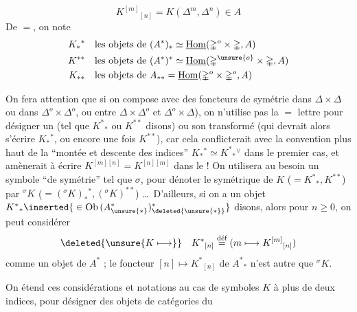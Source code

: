 \[
 K^{[m]}{}_{[n]}=K(\Delta^m,\Delta^n)\in A
\]
De $=$, on note
\[
 \begin{aligned}
 K_*{}^*&\quad\text{les objets de }(A^*)_*\simeq\underline{\mathrm{Hom}}(\mathbb{\Delta}^o\times\mathbb{\Delta},A)\\
 K^{**}&\quad\text{les objets de }(A^*)^*\simeq\underline{\mathrm{Hom}}(\mathbb{\Delta}^{\unsure{o}}\times\mathbb{\Delta},A)\\
 K_{**}&\quad\text{les objets de }A_{**}=\underline{\mathrm{Hom}}(\mathbb{\Delta}^o\times\mathbb{\Delta}^o,A)
 \end{aligned}
\]

On fera attention que si on compose avec  des foncteurs de symétrie   dans $\mathbb{\Delta}\times\mathbb{\Delta}$ ou dans $\mathbb{\Delta}^o\times\mathbb{\Delta}^o$, ou entre $\mathbb{\Delta}\times\mathbb{\Delta}^o$ et $\mathbb{\Delta}^o\times\mathbb{\Delta}$), on n'utilise pas la $=$ lettre pour désigner un   (tel que $K^*{}_*$ ou $K^{**}$ disons) ou son transformé (qui devrait alors s'écrire $K_*{}^*$, ou encore une fois $K^{**}$), car cela conflicterait avec la convention plus haut de la ``montée et descente des indices'' $K_*{}^*\simeq K^*{}_*{}^\vee$ dans le premier cas, et  amènerait à écrire $K^{[m][n]}=K^{[n][m]}$ dans le  ! On utilisera au besoin un symbole ``de symétrie'' tel que $\sigma$, pour dénoter le symétrique de $K$ ($=K^*{}_*,K^{**}$) par $ {}^{\sigma}K$ ($=({}^{\sigma}K)_*{}^*,({}^{\sigma}K)^{**}$) \ldots\ D'ailleurs,  si on a un objet $K^*{}_*\inserted{{}\in\mathrm{Ob}\,(A_{\unsure{*}}^{*})^{*}_{\deleted{\unsure{*}}}}$ disons, alors pour  $n\geq0$, on peut considérer
\[
 \deleted{\unsure{K\longmapsto}}\quad K^*{}_{[n]}\overset{\text{déf}}{=}(m\longmapsto K^{[m]}{}_{[n]})
\]
comme un objet de $A^*$ ; le foncteur $[n]\longmapsto K^*{}_{[n]}$ de $A^*{}_*$ n'est autre que $ {}^{\sigma}K$.

On étend ces considérations et notations au cas de symboles $K$ à plus de deux indices, pour désigner des objets de catégories du
